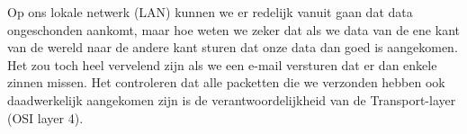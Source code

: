 Op ons lokale netwerk (LAN) kunnen we er redelijk vanuit gaan dat data ongeschonden aankomt, maar hoe weten we zeker dat als we data van de ene kant van de wereld naar de andere kant sturen dat onze data dan goed is aangekomen. Het zou toch heel vervelend zijn als we een e-mail versturen dat er dan enkele zinnen missen. Het controleren dat alle packetten die we verzonden hebben ook daadwerkelijk aangekomen zijn is de verantwoordelijkheid van de Transport-layer (OSI layer 4).
